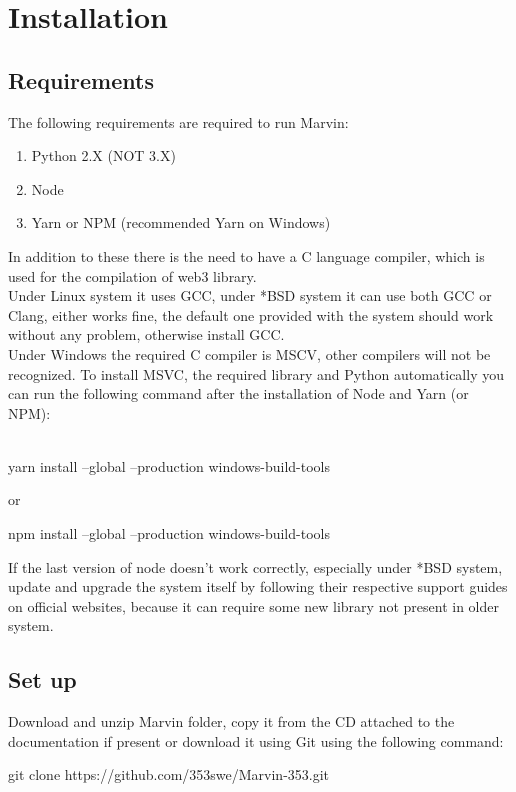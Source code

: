 \documentclass[ManualeSviluppatore.tex]{subfiles}
\begin{document}
\chapter{Installation}
\section{Requirements}
The following requirements are required to run Marvin:
\begin{enumerate}
	\item Python 2.X (NOT 3.X)
	\item Node
	\item Yarn or NPM (recommended Yarn on Windows)
\end{enumerate}
In addition to these there is the need to have a C language compiler, which is used for the compilation of web3 library.\\
Under Linux system it uses GCC, under *BSD system it can use both GCC or Clang, 	
either works fine, the default one provided with the system should work without any problem, otherwise install GCC. \\
Under Windows the required C compiler is MSCV, other compilers will not be recognized. To install MSVC, the required library and Python automatically you can run the following command after the installation of Node and Yarn (or NPM): \\
\\
\begin{ttfamily}
yarn install --global --production windows-build-tools \\
\end{ttfamily}
or \\
\begin{ttfamily}
npm install --global --production windows-build-tools \\
\end{ttfamily}

If the last version of node doesn't work correctly, especially under *BSD system, update and upgrade the system itself by following their respective support guides on official websites, because it can require some new library not present in older system.

\section{Set up}
Download and unzip Marvin folder, copy it from the CD attached to the documentation if present or download it using Git using the following command:
\\
\begin{ttfamily}
	git clone https://github.com/353swe/Marvin-353.git \\
\end{ttfamily}
\end{document}

